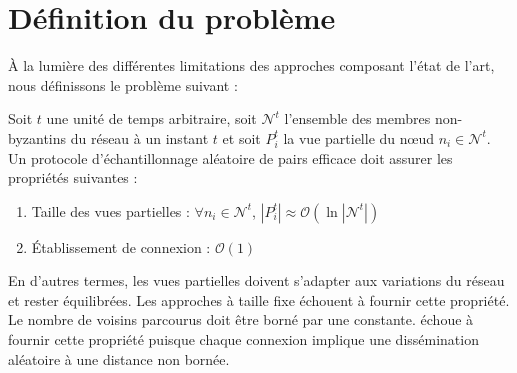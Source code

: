 
\section{Définition du problème}
\label{net:sec:problem}


À la lumière des différentes limitations des approches composant l'état de
l'art, nous définissons le problème suivant :

\begin{problem}
  \label{net:problem:properties}
  Soit $t$ une unité de temps arbitraire, soit $\mathcal{N}^t$ l'ensemble des
  membres non-byzantins du réseau à un instant $t$ et soit $P_i^t$ la vue
  partielle du nœud $n_i \in \mathcal{N}^t$. Un protocole d'échantillonnage
  aléatoire de pairs efficace doit assurer les propriétés suivantes :
  \begin{enumerate}
  \item Taille des vues partielles : \hfill $\forall n_i \in \mathcal{N}^t$,
    $|P_i^t| \approx \mathcal{O}(\ln |\mathcal{N}^t|)$
  \item Établissement de connexion : \hfill $\mathcal{O}(1)$
  \end{enumerate}
\end{problem}
En d'autres termes, les vues partielles doivent s'adapter aux variations du
réseau et rester équilibrées. Les approches à taille fixe échouent à fournir
cette propriété.%
Le nombre de voisins parcourus doit être borné par une constante. \SCAMP échoue
à fournir cette propriété puisque chaque connexion implique une dissémination
aléatoire à une distance non bornée.

